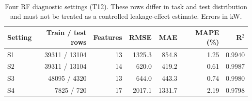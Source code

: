 \begin{table}[H]\centering\small
\caption{Four RF diagnostic settings (T12). These rows differ in task and test distribution and must not be treated as a controlled leakage-effect estimate. Errors in kW.}\label{tab:leakage}
\setlength{\tabcolsep}{4pt}
\begin{tabular}{lrrrrrr}
\toprule
Setting & Train / test rows & Features & RMSE & MAE & MAPE (\%) & R$^2$ \\
\midrule
S1 & \num{39311} / \num{13104} & \num{13} & \num{1325.3} & \num{854.8} & \num{1.25} & \num{0.9940} \\
S2 & \num{39311} / \num{13104} & \num{14} & \num{620.0} & \num{419.2} & \num{0.61} & \num{0.9987} \\
S3 & \num{48095} / \num{4320} & \num{13} & \num{644.0} & \num{443.3} & \num{0.74} & \num{0.9980} \\
S4 & \num{7825} / \num{720} & \num{17} & \num{2017.1} & \num{1331.7} & \num{2.19} & \num{0.9798} \\
\bottomrule\end{tabular}
\end{table}
